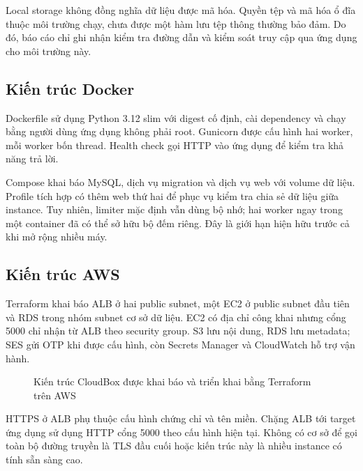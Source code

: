 Local storage không đồng nghĩa dữ liệu được mã hóa. Quyền tệp và mã hóa ổ đĩa thuộc môi trường chạy, chưa được một hàm lưu tệp thông thường bảo đảm. Do đó, báo cáo chỉ ghi nhận kiểm tra đường dẫn và kiểm soát truy cập qua ứng dụng cho môi trường này.
\subsection{Kiến trúc Docker}
Dockerfile sử dụng Python 3.12 slim với digest cố định, cài dependency và chạy bằng người dùng ứng dụng không phải root. Gunicorn được cấu hình hai worker, mỗi worker bốn thread. Health check gọi HTTP vào ứng dụng để kiểm tra khả năng trả lời.

Compose khai báo MySQL, dịch vụ migration và dịch vụ web với volume dữ liệu. Profile tích hợp có thêm web thứ hai để phục vụ kiểm tra chia sẻ dữ liệu giữa instance. Tuy nhiên, limiter mặc định vẫn dùng bộ nhớ; hai worker ngay trong một container đã có thể sở hữu bộ đếm riêng. Đây là giới hạn hiện hữu trước cả khi mở rộng nhiều máy.
\subsection{Kiến trúc AWS}
Terraform khai báo ALB ở hai public subnet, một EC2 ở public subnet đầu tiên và RDS trong nhóm subnet cơ sở dữ liệu. EC2 có địa chỉ công khai nhưng cổng 5000 chỉ nhận từ ALB theo security group. S3 lưu nội dung, RDS lưu metadata; SES gửi OTP khi được cấu hình, còn Secrets Manager và CloudWatch hỗ trợ vận hành.
\begin{figure}[htbp]\centering
{}
\caption{Kiến trúc CloudBox được khai báo và triển khai bằng Terraform trên AWS}
\end{figure}
HTTPS ở ALB phụ thuộc cấu hình chứng chỉ và tên miền. Chặng ALB tới target ứng dụng sử dụng HTTP cổng 5000 theo cấu hình hiện tại. Không có cơ sở để gọi toàn bộ đường truyền là TLS đầu cuối hoặc kiến trúc này là nhiều instance có tính sẵn sàng cao.

